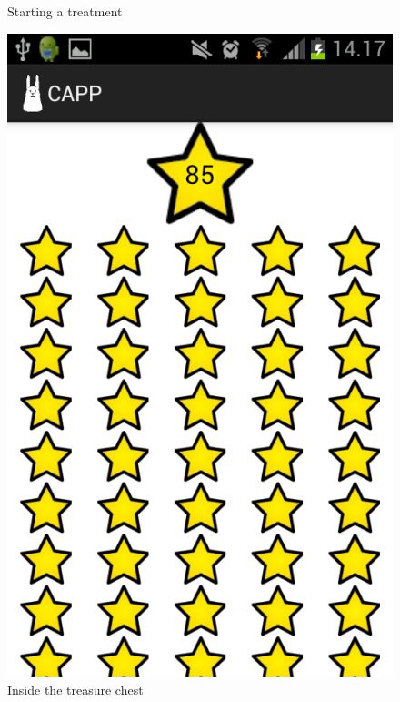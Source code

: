 \begin{figure}[H]
\begin{minipage}[b]{0.3\linewidth}
		\caption{Starting a treatment}
		\label{fig:capp_start_treatment}
	\end{minipage}
	\begin{minipage}[b]{0.3\linewidth}
		\centering
			\includegraphics[width=0.20\paperwidth]{Pictures/app-screenshots/capp_stars.png}
		\caption{Inside the treasure chest}
		\label{fig:capp_stars}
	\end{minipage}
	\begin{minipage}[b]{0.3\linewidth}	
		\centering

\end{minipage}
\end{figure}
